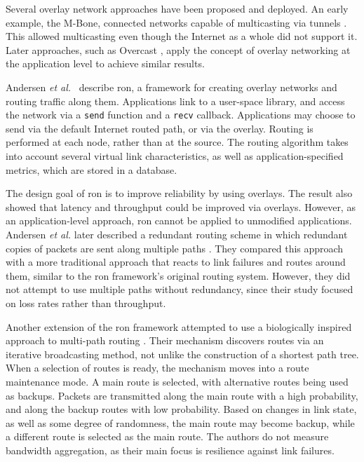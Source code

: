 \documentclass{cwru}
\begin{document}
Several overlay network approaches have been proposed and deployed. An early
example, the M-Bone, connected networks capable of multicasting via tunnels
\cite{mbone}. This allowed multicasting even though the Internet as a whole did
not support it. Later approaches, such as Overcast \cite{jannotti2000overcast},
apply the concept of overlay networking at the application level to achieve
similar results.

Andersen \textit{et al.}~\cite{ron} describe \ac{ron}, a framework for creating
overlay networks and routing traffic along them. Applications link to a
user-space library, and access the network via a \texttt{send} function and a
\texttt{recv} callback. Applications may choose to send via the default Internet
routed path, or via the overlay. Routing is performed at each node, rather than
at the source. The routing algorithm takes into account several virtual link
characteristics, as well as application-specified metrics, which are stored in a
database.

The design goal of \ac{ron} is to improve reliability by using overlays. The
result also showed that latency and throughput could be improved via overlays.
However, as an application-level approach, \ac{ron} cannot be applied to
unmodified applications. Andersen \textit{et al.} later described a redundant
routing scheme in which redundant copies of packets are sent along multiple
paths \cite{andersen2003best}. They compared this approach with a more
traditional approach that reacts to link failures and routes around them,
similar to the \ac{ron} framework's original routing system. However, they did
not attempt to use multiple paths without redundancy, since their study focused
on loss rates rather than throughput.

Another extension of the \ac{ron} framework attempted to use a biologically
inspired approach to multi-path routing \cite{leibnitz2006biologically}. Their
mechanism discovers routes via an iterative broadcasting method, not unlike the
construction of a shortest path tree. When a selection of routes is ready, the
mechanism moves into a route maintenance mode. A main route is selected, with
alternative routes being used as backups. Packets are transmitted along the main
route with a high probability, and along the backup routes with low probability.
Based on changes in link state, as well as some degree of randomness, the main
route may become backup, while a different route is selected as the main route.
The authors do not measure bandwidth aggregation, as their main focus is
resilience against link failures.
\end{document}
